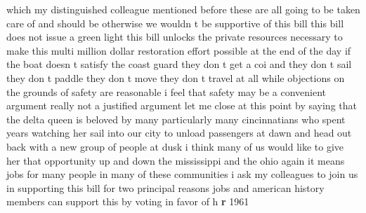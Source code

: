 \documentclass{article}
\begin{document}
which my distinguished colleague mentioned before these are all going to be taken care of and should be otherwise we wouldn t be supportive of this bill this bill does not issue a green light this bill unlocks the private resources necessary to make this multi million dollar restoration effort possible at the end of the day if the boat doesn t satisfy the coast guard they don t get a coi and they don t sail they don t paddle they don t move they don t travel at all while objections on the grounds of safety are reasonable i feel that safety may be a convenient argument really not a justified argument let me close at this point by saying that the delta queen is beloved by many particularly many cincinnatians who spent years watching her sail into our city to unload passengers at dawn and head out back with a new group of people at dusk i think many of us would like to give her that opportunity up and down the mississippi and the ohio again it means jobs for many people in many of these communities i ask my colleagues to join us in supporting this bill for two principal reasons jobs and american history members can support this by voting in favor of h {\bf \color{red} r} 1961
\vspace{8mm}
\end{document}
